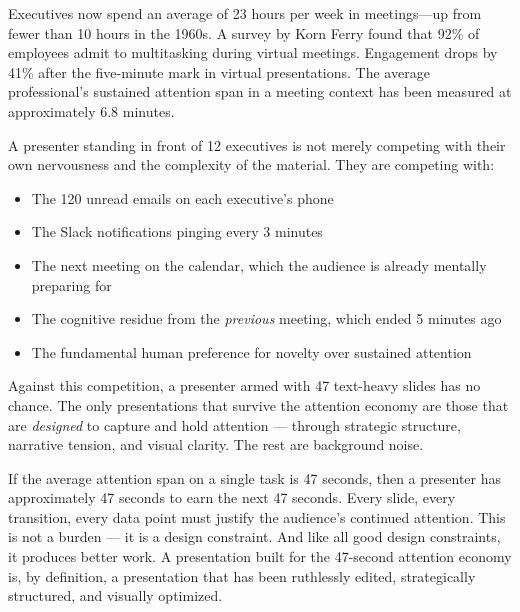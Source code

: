 Executives now spend an average of 23 hours per week in meetings---up from fewer than 10 hours in the 1960s. A survey by Korn Ferry found that 92\% of employees admit to multitasking during virtual meetings. Engagement drops by 41\% after the five-minute mark in virtual presentations. The average professional's sustained attention span in a meeting context has been measured at approximately 6.8 minutes.

A presenter standing in front of 12 executives is not merely competing with their own nervousness and the complexity of the material. They are competing with:

\begin{itemize}
  \item The 120 unread emails on each executive's phone
  \item The Slack notifications pinging every 3 minutes
  \item The next meeting on the calendar, which the audience is already mentally preparing for
  \item The cognitive residue from the \emph{previous} meeting, which ended 5 minutes ago
  \item The fundamental human preference for novelty over sustained attention
\end{itemize}

Against this competition, a presenter armed with 47 text-heavy slides has no chance. The only presentations that survive the attention economy are those that are \emph{designed} to capture and hold attention --- through strategic structure, narrative tension, and visual clarity. The rest are background noise.

\begin{insightbox}
If the average attention span on a single task is 47 seconds, then a presenter has approximately 47 seconds to earn the next 47 seconds. Every slide, every transition, every data point must justify the audience's continued attention. This is not a burden --- it is a design constraint. And like all good design constraints, it produces better work. A presentation built for the 47-second attention economy is, by definition, a presentation that has been ruthlessly edited, strategically structured, and visually optimized.
\end{insightbox}

